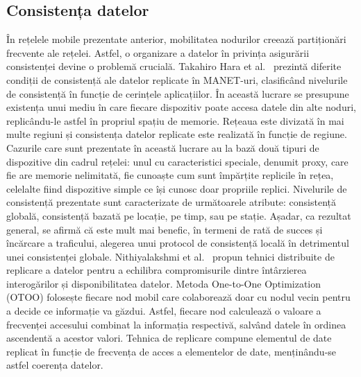 \documentclass[12pt,a4paper]{report}
\begin{document}
\subsection{Consistența datelor}
În rețelele mobile prezentate anterior, mobilitatea nodurilor creează partiționări frecvente ale rețelei. Astfel, o organizare a datelor în privința asigurării consistenței devine o problemă crucială. Takahiro Hara et al.~\cite{hara2009consistency} prezintă diferite condiții de consistență ale datelor replicate în MANET-uri, clasificând nivelurile de consistență în funcție de cerințele aplicațiilor. În această lucrare se presupune existența unui mediu în care fiecare dispozitiv poate accesa datele din alte noduri, replicându-le astfel în propriul spațiu de memorie. Rețeaua este divizată în mai multe regiuni și consistența datelor replicate este realizată în funcție de regiune. Cazurile care sunt prezentate în această lucrare au la bază două tipuri de dispozitive din cadrul rețelei: unul cu caracteristici speciale, denumit proxy, care fie are memorie nelimitată, fie cunoaște cum sunt împărțite replicile în rețea, celelalte fiind dispozitive simple ce își cunosc doar propriile replici. Nivelurile de consistență prezentate sunt caracterizate de următoarele atribute: consistență globală, consistență bazată pe locație, pe timp, sau pe stație. Așadar, ca rezultat general, se afirmă că este mult mai benefic, în termeni de rată de succes și încărcare a traficului, alegerea unui protocol de consistență locală în detrimentul unei consistenței globale.
Nithiyalakshmi et al.~\cite{nithiyalakshmi2014data} propun tehnici distribuite de replicare a datelor pentru a echilibra compromisurile dintre întârzierea interogărilor și disponibilitatea datelor. Metoda One-to-One Optimization (OTOO) folosește fiecare nod mobil care colaborează doar cu nodul vecin pentru a decide ce informație va găzdui. Astfel, fiecare nod calculează o valoare a frecvenței accesului combinat la informația respectivă, salvând datele în ordinea ascendentă a acestor valori. Tehnica de replicare compune elementul de date replicat în funcție de frecvența de acces a elementelor de date, menținându-se astfel coerența datelor.
\end{document}
